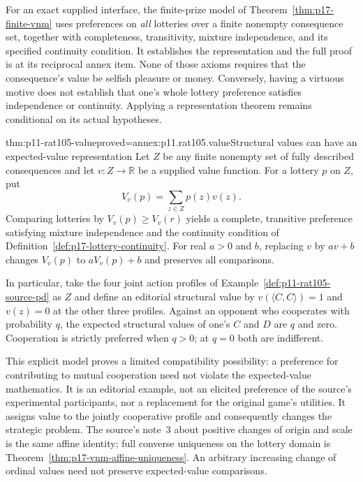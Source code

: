 For an exact supplied interface, the finite-prize model of
Theorem~\ref{thm:p17-finite-vnm} uses preferences on \emph{all}
lotteries over a finite nonempty consequence set, together with
completeness, transitivity, mixture independence, and its specified
continuity condition. It establishes the representation and the full
proof is at its reciprocal annex item. None of those axioms requires
that the consequence's value be selfish pleasure or money. Conversely,
having a virtuous motive does not establish that one's whole lottery
preference satisfies independence or continuity. Applying a
representation theorem remains conditional on its actual hypotheses.

\begin{hbtheorem}{thm:p11-rat105-value}{proved=annex:p11.rat105.value}{Structural values can have an expected-value representation}
Let \(Z\) be any finite nonempty set of fully described consequences
and let \(v:Z\to\mathbb R\) be a supplied value function. For a
lottery \(p\) on \(Z\), put
\[
 V_v(p)=\sum_{z\in Z}p(z)v(z).
\]
Comparing lotteries by \(V_v(p)\geq V_v(r)\) yields a complete,
transitive preference satisfying mixture independence and the continuity
condition of Definition~\ref{def:p17-lottery-continuity}. For real
\(a>0\) and \(b\), replacing \(v\) by \(av+b\) changes
\(V_v(p)\) to \(aV_v(p)+b\) and preserves all comparisons.

In particular, take the four joint action profiles of
Example~\ref{def:p11-rat105-source-pd} as \(Z\) and define an
editorial structural value by
\(v(\langle C,C\rangle)=1\) and \(v(z)=0\) at the other three
profiles. Against an opponent who cooperates with probability \(q\),
the expected structural values of one's \(C\) and \(D\) are \(q\)
and zero. Cooperation is strictly preferred when \(q>0\); at
\(q=0\) both are indifferent.
\end{hbtheorem}

This explicit model proves a limited compatibility possibility: a
preference for contributing to mutual cooperation need not violate the
expected-value mathematics. It is an editorial example, not an elicited
preference of the source's experimental participants, nor a replacement
for the original game's utilities. It assigns value to the jointly
cooperative profile and consequently changes the strategic problem.
The source's note~3 about positive changes of origin and scale is the
same affine identity; full converse uniqueness on the lottery domain is
Theorem~\ref{thm:p17-vnm-affine-uniqueness}. An arbitrary increasing
change of ordinal values need not preserve expected-value comparisons.


